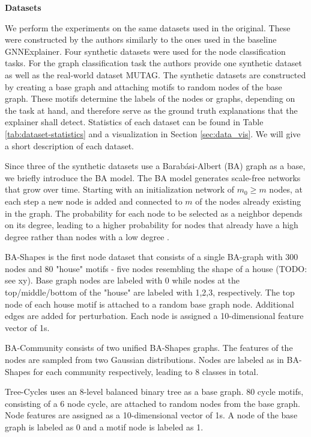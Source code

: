\textbf{Datasets}\par
We perform the experiments on the same datasets used in the original. These were constructed by the authors similarly to the ones used in the baseline GNNExplainer. Four synthetic datasets were used for the node classification tasks. For the graph classification task the authors provide one synthetic dataset as well as the real-world dataset MUTAG. The synthetic datasets are constructed by creating a base graph and attaching motifs to random nodes of the base graph. These motifs determine the labels of the nodes or graphs, depending on the task at hand, and therefore serve as the ground truth explanations that the explainer shall detect. Statistics of each dataset can be found in Table \ref{tab:dataset-statistics} and a visualization in Section \ref{sec:data_vis}. We will give a short description of each dataset. \bigskip

Since three of the synthetic datasets use a Barabási-Albert (BA) graph as a base, we briefly introduce the BA model. The BA model generates scale-free networks that grow over time. Starting with an initialization network of $m_0 \geq m$ nodes, at each step a new node is added and connected to $m$ of the nodes already existing in the graph. The probability for each node to be selected as a neighbor depends on its degree, leading to a higher probability for nodes that already have a high degree rather than nodes with a low degree \cite{albert2002statistical}. \bigskip

BA-Shapes is the first node dataset that consists of a single BA-graph with 300 nodes and 80 "house" motifs - five nodes resembling the shape of a house (TODO: see xy). Base graph nodes are labeled with 0 while nodes at the top/middle/bottom of the "house" are labeled with 1,2,3, respectively. The top node of each house motif is attached to a random base graph node. Additional edges are added for perturbation. Each node is assigned a 10-dimensional feature vector of 1s.

BA-Community consists of two unified BA-Shapes graphs. The features of the nodes are sampled from two Gaussian distributions. Nodes are labeled as in BA-Shapes for each community respectively, leading to 8 classes in total.

Tree-Cycles uses an 8-level balanced binary tree as a base graph. 80 cycle motifs, consisting of a 6 node cycle, are attached to random nodes from the base graph. Node features are assigned as a 10-dimensional vector of 1s. A node of the base graph is labeled as 0 and a motif node is labeled as 1.

